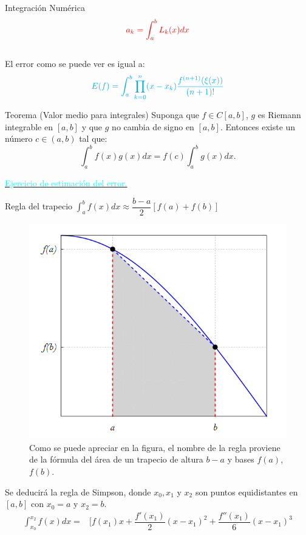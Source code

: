 \begin{frame}[allowframebreaks]{Integración Numérica}
$$\textcolor{red}{a_k=\int_a^b L_k(x)dx}$$\\
El error como se puede ver es igual a:
$$\textcolor{cyan}{E(f)=\int_a^b\prod_{k=0}^{n}(x-x_k)\dfrac{f^{(n+1)}(\xi(x))}{(n+1)!}}$$
\begin{block}{Teorema (Valor medio para integrales)}
Suponga que $f\in C[a,b]$, $g$ es Riemann integrable en $[a,b]$ y que $g$ no cambia de signo en $[a,b]$. Entonces existe un número $c\in (a,b)$ tal que:
$$\int_{a}^{b}f(x)g(x)dx=f(c)\int_a^bg(x)dx.$$
\end{block}
\label{CuadraturaTeoremaValorMedio}
\hyperlink{EjercicioCuadraturaError}{\textcolor{cyan}{Ejercicio de estimación del error.}}
\begin{block}{Regla del trapecio}
\centering $\displaystyle \int_a^b f(x)dx\approx \dfrac{b-a}{2}[f(a)+f(b)]$
\end{block}
\begin{figure}[H]
\centering
\includegraphics[scale=0.6]{Imagen24}
\caption{Como se puede apreciar en la figura, el nombre de la regla proviene de la fórmula del área de un trapecio de altura $b-a$ y bases $f(a)$, $f(b)$.}
\end{figure}
\small
\vspace*{-0.5cm}
\indent Se deducirá la regla de Simpson, donde $x_0,x_1$ y $x_2$ son puntos equidistantes en $[a,b]$ con $x_0=a$ y $x_2=b$.
\begin{displaymath}
\begin{array}{rl}
\displaystyle \int_{x_0}^{x_2} f(x)dx=&\bigg[f(x_1)x+\dfrac{f'(x_1)}{2}(x-x_1)^2+\dfrac{f''(x_1)}{6}(x-x_1)^3\\

\end{array}
\end{displaymath}
\end{frame}
